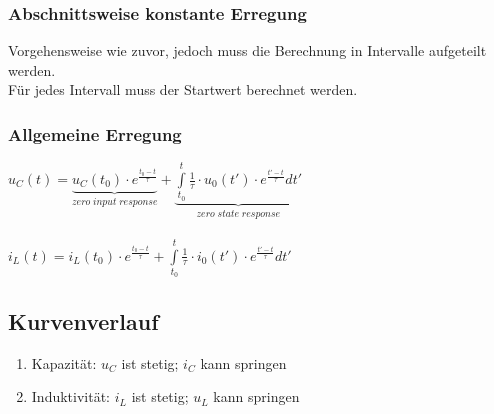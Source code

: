\documentclass[a4paper,twocolumn,10pt]{article}
\begin{document}
\subsubsection*{Abschnittsweise konstante Erregung}
Vorgehensweise wie zuvor, jedoch muss die Berechnung in Intervalle aufgeteilt werden.\\
Für jedes Intervall muss der Startwert berechnet werden.

\subsubsection*{Allgemeine Erregung}
$u_C(t)=\underbrace{u_C(t_0)\cdot e^{\frac{t_0-t}{\tau}}}_{zero\;input\;response}+\underbrace{\int\limits_{t_0}^{t}\frac{1}{\tau}\cdot u_0(t')\cdot e^{\frac{t'-t}{\tau}}dt'}_{zero\;state\;response}$\\\\
$i_L(t)=i_L(t_0)\cdot e^{\frac{t_0-t}{\tau}}+\int\limits_{t_0}^{t}\frac{1}{\tau}\cdot i_0(t')\cdot e^{\frac{t'-t}{\tau}}dt'$

\subsection*{Kurvenverlauf}
\begin{enumerate}[label=-,leftmargin=3mm]
	\item Kapazität: $u_C$ ist stetig; $i_C$ kann springen
	\item Induktivität: $i_L$ ist stetig; $u_L$ kann springen
\end{enumerate}
\end{document}
